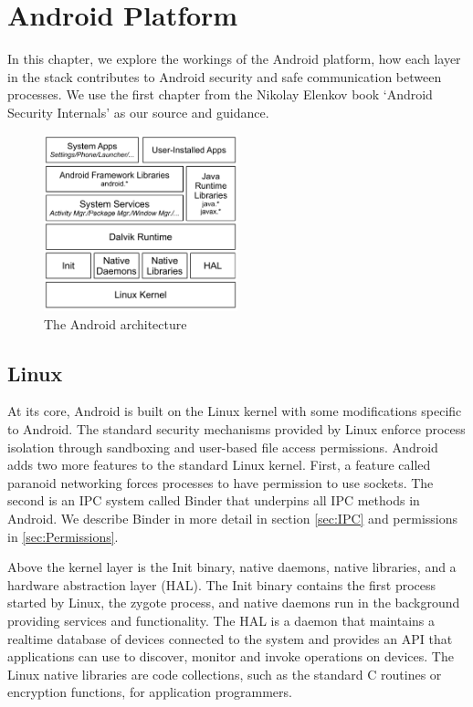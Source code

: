 \chapter{Android Platform}
\label{chap:Android Platform}

In this chapter, we explore the workings of the Android platform, how each layer in the stack contributes to Android security and safe communication between processes.  We use the first chapter from the Nikolay Elenkov book `Android Security Internals' \cite{AndroidSecurityInternals} as our source and guidance.

\begin{figure}[h]
  \centering
  \includegraphics[width=0.5\textwidth]{graphics/AndroidStack.pdf}
  \caption{The Android architecture}
  \label{fig:AndroidStack}
\end{figure}

\section{Linux}
\label{sec:Linux}

At its core, Android is built on the Linux kernel with some modifications specific to Android.  The standard security mechanisms provided by Linux enforce process isolation through sandboxing and user-based file access permissions.  Android adds two more features to the standard Linux kernel.  First, a feature called paranoid networking forces processes to have permission to use sockets. The second is an IPC system called Binder that underpins all IPC methods in Android.  We describe Binder in more detail in section \ref{sec:IPC} and permissions in \ref{sec:Permissions}.

Above the kernel layer is the Init binary, native daemons, native libraries, and a hardware abstraction layer (HAL).  The Init binary contains the first process started by Linux, the zygote process, and native daemons run in the background providing services and functionality.  The HAL is a daemon that maintains a realtime database of devices connected to the system and provides an API that applications can use to discover, monitor and invoke operations on devices. The Linux native libraries are code collections, such as the standard C routines or encryption functions, for application programmers.


